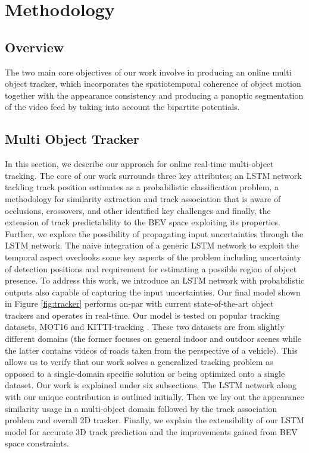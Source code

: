 \chapter{Methodology}
\label{chapter:method}

\section{Overview}
The two main core objectives of our work involve in producing an online multi object tracker, which incorporates the spatiotemporal coherence of object motion together with the appearance consistency and producing a panoptic segmentation of the video feed by taking into account the bipartite potentials.

\section{Multi Object Tracker}

In this section, we describe our approach for online real-time multi-object tracking. The core of our work surrounds three key attributes; an LSTM network tackling track position estimates as a probabilistic classification problem, a methodology for similarity extraction and track association that is aware of occlusions, crossovers, and other identified key challenges and finally, the extension of track predictability to the BEV space exploiting its properties. Further, we explore the possibility of propagating input uncertainties through the LSTM network. The naive integration of a generic LSTM network to exploit the temporal aspect overlooks some key aspects of the problem including uncertainty of detection positions and requirement for estimating a possible region of object presence. To address this work, we introduce an LSTM network with probabilistic outputs also capable of capturing the input uncertainties. Our final model shown in Figure \ref{fig:tracker} performs on-par with current state-of-the-art object trackers and operates in real-time. Our model is tested on popular tracking datasets, MOT16 \cite{DeepSiam:MilanL0RS16} and KITTI-tracking \cite{DeepSiam:KITTI}. These two datasets are from slightly different domains (the former focuses on general indoor and outdoor scenes while the latter contains videos of roads taken from the perspective of a vehicle). This allows us to verify that our work solves a generalized tracking problem as opposed to a single-domain specific solution or being optimized onto a single dataset. Our work is explained under six subsections. The LSTM network along with our unique contribution is outlined initially. Then we lay out the appearance similarity usage in a multi-object domain followed by the track association problem and overall 2D tracker. Finally, we explain the extensibility of our LSTM model for accurate 3D track prediction and the improvements gained from BEV space constraints.


